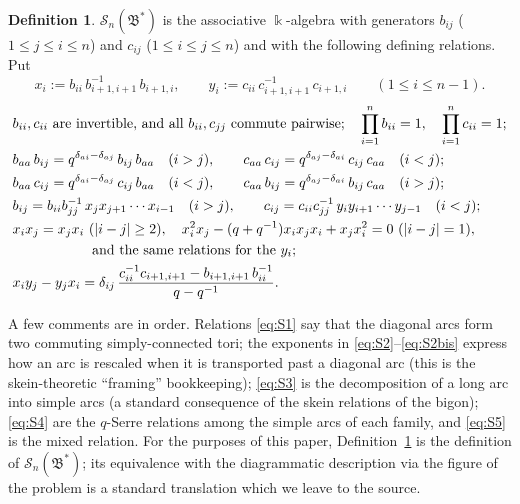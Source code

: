 \documentclass[11pt]{amsart}
\newcommand{\bk}{\Bbbk}
\theoremstyle{plain}
\theoremstyle{definition}
\newtheorem{definition}[theorem]{Definition}
\numberwithin{equation}{section}
\begin{document}
\begin{definition}\label{def:S}
$\mathscr S_n(\mathfrak B^*)$ is the associative $\bk$-algebra with
generators $b_{ij}$ ($1\le j\le i\le n$) and $c_{ij}$ ($1\le i\le j\le n$)
and with the following defining relations.  Put
\begin{equation}\label{eq:xandy}
x_i:=b_{ii}\,b_{i+1,i+1}^{-1}\,b_{i+1,i},\qquad
y_i:=c_{ii}\,c_{i+1,i+1}^{-1}\,c_{i+1,i}\qquad (1\le i\le n-1).
\end{equation}
\begin{align}
&b_{ii},c_{ii}\ \text{are invertible, and all }b_{ii},c_{jj}
\text{ commute pairwise};\quad
\prod_{i=1}^{n}b_{ii}=1,\quad \prod_{i=1}^{n}c_{ii}=1;
\label{eq:S1}\\
&b_{aa}\,b_{ij}=q^{\delta_{ai}-\delta_{aj}}\,b_{ij}\,b_{aa}\quad(i>j),
\qquad
c_{aa}\,c_{ij}=q^{\delta_{aj}-\delta_{ai}}\,c_{ij}\,c_{aa}\quad(i<j);
\label{eq:S2}\\
&b_{aa}\,c_{ij}=q^{\delta_{ai}-\delta_{aj}}\,c_{ij}\,b_{aa}\quad(i<j),\qquad
c_{aa}\,b_{ij}=q^{\delta_{aj}-\delta_{ai}}\,b_{ij}\,c_{aa}\quad(i>j);
\label{eq:S2bis}\\
&b_{ij}=b_{ii}b_{jj}^{-1}\,x_jx_{j+1}\cdots x_{i-1}\quad(i>j),\qquad
c_{ij}=c_{ii}c_{jj}^{-1}\,y_iy_{i+1}\cdots y_{j-1}\quad(i<j);
\label{eq:S3}\\
&x_ix_j=x_jx_i\ (|i-j|\ge2),\quad
x_i^2x_j-(q+q^{-1})x_ix_jx_i+x_jx_i^2=0\ (|i-j|=1),\notag\\
&\hspace{2cm}\text{and the same relations for the }y_i;
\label{eq:S4}\\
&x_iy_j-y_jx_i=\delta_{ij}\,
\frac{c_{ii}^{-1}c_{i+1,i+1}-b_{i+1,i+1}\,b_{ii}^{-1}}{q-q^{-1}} .
\label{eq:S5}
\end{align}
\end{definition}

A few comments are in order.  Relations \eqref{eq:S1} say that the diagonal
arcs form two commuting simply-connected tori; the exponents in
\eqref{eq:S2}--\eqref{eq:S2bis} express how an arc is rescaled when it is
transported past a diagonal arc (this is the skein-theoretic ``framing''
bookkeeping); \eqref{eq:S3} is the decomposition of a long arc into simple
arcs (a standard consequence of the skein relations of the bigon);
\eqref{eq:S4} are the $q$-Serre relations among the simple arcs of each
family, and \eqref{eq:S5} is the mixed relation.  For the purposes of this
paper, Definition~\ref{def:S} is the definition of
$\mathscr S_n(\mathfrak B^*)$; its equivalence with the diagrammatic
description via the figure of the problem is a standard translation which we
leave to the source.
\end{document}
